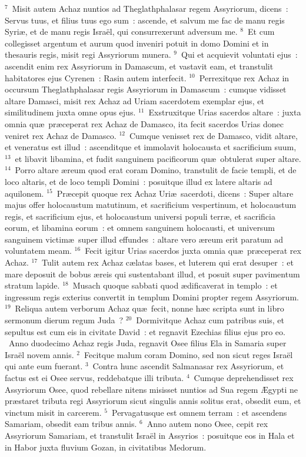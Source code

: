 ${}^{7}$~Misit autem Achaz nuntios ad Theglathphalasar regem Assyriorum, dicens~: Servus tuus, et filius tuus ego sum~: ascende, et salvum me fac de manu regis Syri\ae , et de manu regis Isra\"el, qui consurrexerunt adversum me.
${}^{8}$~Et cum collegisset argentum et aurum quod inveniri potuit in domo Domini et in thesauris regis, misit regi Assyriorum munera.
${}^{9}$~Qui et acquievit voluntati ejus~: ascendit enim rex Assyriorum in Damascum, et vastavit eam, et transtulit habitatores ejus Cyrenen~: Rasin autem interfecit.
${}^{10}$~Perrexitque rex Achaz in occursum Theglathphalasar regis Assyriorum in Damascum~: cumque vidisset altare Damasci, misit rex Achaz ad Uriam sacerdotem exemplar ejus, et similitudinem juxta omne opus ejus.
${}^{11}$~Exstruxitque Urias sacerdos altare~: juxta omnia qu\ae\ pr\ae ceperat rex Achaz de Damasco, ita fecit sacerdos Urias donec veniret rex Achaz de Damasco.
${}^{12}$~Cumque venisset rex de Damasco, vidit altare, et veneratus est illud~: ascenditque et immolavit holocausta et sacrificium suum,
${}^{13}$~et libavit libamina, et fudit sanguinem pacificorum qu\ae\ obtulerat super altare.
${}^{14}$~Porro altare \ae reum quod erat coram Domino, transtulit de facie templi, et de loco altaris, et de loco templi Domini~: posuitque illud ex latere altaris ad aquilonem.
${}^{15}$~Pr\ae cepit quoque rex Achaz Uri\ae\ sacerdoti, dicens~: Super altare majus offer holocaustum matutinum, et sacrificium vespertinum, et holocaustum regis, et sacrificium ejus, et holocaustum universi populi terr\ae , et sacrificia eorum, et libamina eorum~: et omnem sanguinem holocausti, et universum sanguinem victim\ae\ super illud effundes~: altare vero \ae reum erit paratum ad voluntatem meam.
${}^{16}$~Fecit igitur Urias sacerdos juxta omnia qu\ae\ pr\ae ceperat rex Achaz.
${}^{17}$~Tulit autem rex Achaz c\ae latas bases, et luterem qui erat desuper~: et mare deposuit de bobus \ae reis qui sustentabant illud, et posuit super pavimentum stratum lapide.
${}^{18}$~Musach quoque sabbati quod \ae dificaverat in templo~: et ingressum regis exterius convertit in templum Domini propter regem Assyriorum.
${}^{19}$~Reliqua autem verborum Achaz qu\ae\ fecit, nonne h\ae c scripta sunt in libro sermonum dierum regum Juda~?
${}^{20}$~Dormivitque Achaz cum patribus suis, et sepultus est cum eis in civitate David~: et regnavit Ezechias filius ejus pro eo.
~\lettrine[lines=10,image=true,loversize=0.05,lraise=-0.03]{A}{}nno duodecimo Achaz regis Juda, regnavit Osee filius Ela in Samaria super Isra\"el novem annis.
${}^{2}$~Fecitque malum coram Domino, sed non sicut reges Isra\"el qui ante eum fuerant.
${}^{3}$~Contra hunc ascendit Salmanasar rex Assyriorum, et factus est ei Osee servus, reddebatque illi tributa.
${}^{4}$~Cumque deprehendisset rex Assyriorum Osee, quod rebellare nitens misisset nuntios ad Sua regem \AE gypti ne pr\ae staret tributa regi Assyriorum sicut singulis annis solitus erat, obsedit eum, et vinctum misit in carcerem.
${}^{5}$~Pervagatusque est omnem terram~: et ascendens Samariam, obsedit eam tribus annis.
${}^{6}$~Anno autem nono Osee, cepit rex Assyriorum Samariam, et transtulit Isra\"el in Assyrios~: posuitque eos in Hala et in Habor juxta fluvium Gozan, in civitatibus Medorum.


